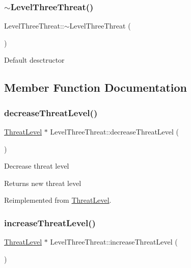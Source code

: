 \subsubsection{\texorpdfstring{$\sim$\+Level\+Three\+Threat()}{~LevelThreeThreat()}}
{\footnotesize\ttfamily Level\+Three\+Threat\+::$\sim$\+Level\+Three\+Threat (\begin{DoxyParamCaption}{ }\end{DoxyParamCaption})}

Default desctructor 

\subsection{Member Function Documentation}
\mbox{\label{classLevelThreeThreat_a98337ab08fe61b136d9c9e48f7ace804}} 
\subsubsection{\texorpdfstring{decrease\+Threat\+Level()}{decreaseThreatLevel()}}
{\footnotesize\ttfamily \hyperlink{classThreatLevel}{Threat\+Level} $\ast$ Level\+Three\+Threat\+::decrease\+Threat\+Level (\begin{DoxyParamCaption}{ }\end{DoxyParamCaption})\hspace{0.3cm}{\ttfamily [virtual]}}

Decrease threat level \begin{DoxyReturn}{Returns}
new threat level 
\end{DoxyReturn}


Reimplemented from \hyperlink{classThreatLevel_a3545ec161fbe4c01beafb9b43624c7e8}{Threat\+Level}.

\mbox{\label{classLevelThreeThreat_a284c2b79a9a85f5e164f15c258c6e9ca}} 
\subsubsection{\texorpdfstring{increase\+Threat\+Level()}{increaseThreatLevel()}}
{\footnotesize\ttfamily \hyperlink{classThreatLevel}{Threat\+Level} $\ast$ Level\+Three\+Threat\+::increase\+Threat\+Level (\begin{DoxyParamCaption}{ }\end{DoxyParamCaption})\hspace{0.3cm}{\ttfamily [virtual]}}

